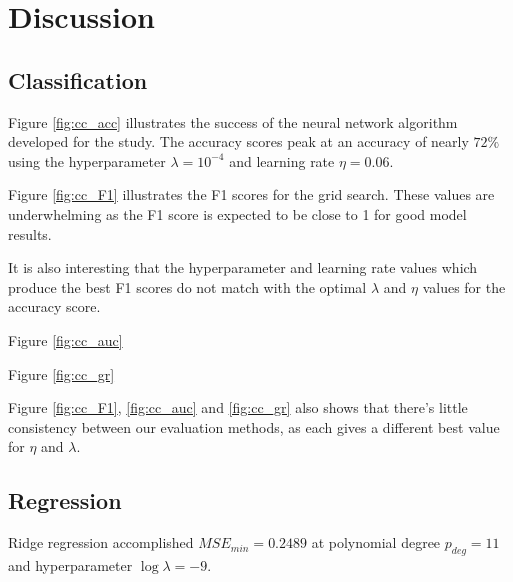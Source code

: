 \section{Discussion}
    \subsection{Classification}
             
        Figure \ref{fig:cc_acc} illustrates the success of the neural network algorithm developed for the study. The accuracy scores peak at an accuracy of nearly $72\%$ using the hyperparameter $\lambda = 10^{-4}$ and learning rate $\eta = 0.06$.
        
        Figure \ref{fig:cc_F1} illustrates the F1 scores for the grid search. These values are underwhelming as the F1 score is expected to be close to 1 for good model results. 
        
        It is also interesting that the hyperparameter and learning rate values which produce the best F1 scores do not match with the optimal $\lambda$ and $\eta$ values for the accuracy score.
        
        Figure \ref{fig:cc_auc}
        
        Figure \ref{fig:cc_gr}
        
        Figure \ref{fig:cc_F1}, \ref{fig:cc_auc} and \ref{fig:cc_gr} also shows that there's little  consistency between our evaluation methods, as each gives a different best value for $\eta$ and $\lambda$.
        
            
            
    \subsection{Regression}
        Ridge regression accomplished $MSE_{min}=0.2489$ at polynomial degree $p_{deg}=11$ and hyperparameter $\log\lambda=-9$.
             
